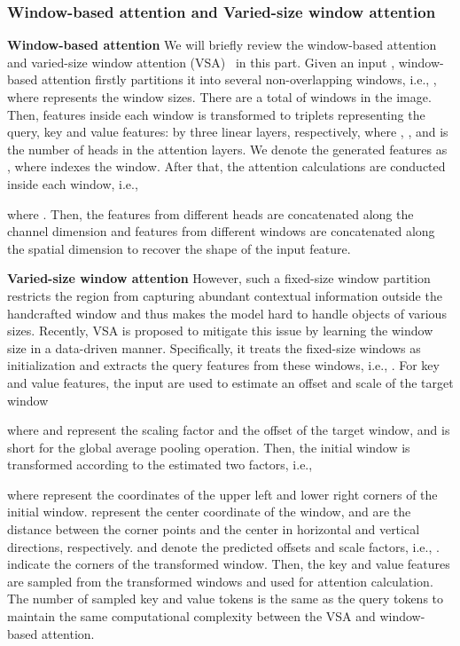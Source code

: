 \documentclass[10pt, journal,twoside]{IEEEtran}
\begin{document}
\subsubsection{Window-based attention and Varied-size window attention}

\noindent\textbf{Window-based attention} We will briefly review the window-based attention~\cite{swint} and varied-size window attention (VSA)~\cite{zhang2022vsa} in this part. Given an input , window-based attention firstly partitions it into several non-overlapping windows, i.e., , where  represents the window sizes. There are a total of  windows in the image. Then, features inside each window is transformed to  triplets representing the query, key and value features:  by three linear layers, respectively, where , , and  is the number of heads in the attention layers. We denote the generated features as , where  indexes the window. After that, the attention calculations are conducted inside each window, i.e.,

where . Then, the features from different heads are concatenated along the channel dimension and features from different windows are concatenated along the spatial dimension to recover the shape of the input feature.

\noindent\textbf{Varied-size window attention} However, such a fixed-size window partition restricts the region from capturing abundant contextual information outside the handcrafted window and thus makes the model hard to handle objects of various sizes. Recently, VSA is proposed to mitigate this issue by learning the window size in a data-driven manner. Specifically, it treats the fixed-size windows as initialization and extracts the query features from these windows, i.e., . For key and value features, the input  are used to estimate an offset and scale of the target window

where  and  represent the scaling factor and the offset of the target window, and  is short for the global average pooling operation. Then, the initial window is transformed according to the estimated two factors, i.e.,


where  represent the coordinates of the upper left and lower right corners of the initial window.  represent the center coordinate of the window, and  are the distance between the corner points and the center in horizontal and vertical directions, respectively.  and  denote the predicted offsets and scale factors, i.e., .  indicate the corners of the transformed window. Then, the key and value features are sampled from the transformed windows and used for attention calculation. The number of sampled key and value tokens is the same as the query tokens to maintain the same computational complexity between the VSA and window-based attention. 
\end{document}
